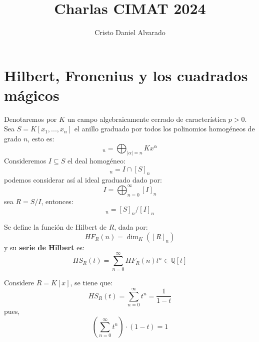 \documentclass[12pt]{report}
\newcounter{it}
\theoremstyle{largebreak}
\newcommand\abs[1]{\ensuremath{\left|#1\right|}}
\begin{document}
    \setlength{\parskip}{5pt} %
    \setlength{\parindent}{12pt} %
    \title{Charlas CIMAT 2024}
    \author{Cristo Daniel Alvarado}
    \maketitle

    \tableofcontents %


    \newpage

    \chapter{Hilbert, Fronenius y los cuadrados mágicos}

    Denotaremos por $K$ un campo algebraicamente cerrado de característica $p>0$. Sea $S=K[x_1,...,x_n]$ el anillo graduado por todos los polinomios homogéneos de grado $n$, esto es:
    \begin{equation*}
        [S]_n=\bigoplus_{ \abs{\alpha}=n}Kx^{\alpha}
    \end{equation*}
    Consideremos $I\subseteq S$ el deal homogéneo:
    \begin{equation*}
        [I]_n=I\cap[S]_n
    \end{equation*}
    podemos considerar así al ideal graduado dado por:
    \begin{equation*}
        I=\bigoplus_{ n=0}^\infty[I]_n
    \end{equation*}
    sea $R=S/I$, entonces:
    \begin{equation*}
        [R]_n=[S]_n/[I]_n
    \end{equation*}

    \begin{mydef}
        Se define la función de Hilbert de $R$, dada por:
        \begin{equation*}
            HF_R(n)=\dim_K([R]_n)
        \end{equation*}
        y su \textbf{serie de Hilbert} es:
        \begin{equation*}
            HS_R(t)=\sum_{ n=0}^\infty HF_R(n)t^n\in\mathbb{Q}[t]
        \end{equation*}
    \end{mydef}

    \begin{exa}
        Considere $R=K[x]$, se tiene que:
        \begin{equation*}
            HS_R(t)=\sum_{ n=0}^\infty t^n=\frac{1}{1-t}
        \end{equation*}
        pues,
        \begin{equation*}
            \left(\sum_{ n=0}^\infty t^n\right)\cdot(1-t)=1
        \end{equation*}
    \end{exa}
\end{document}
